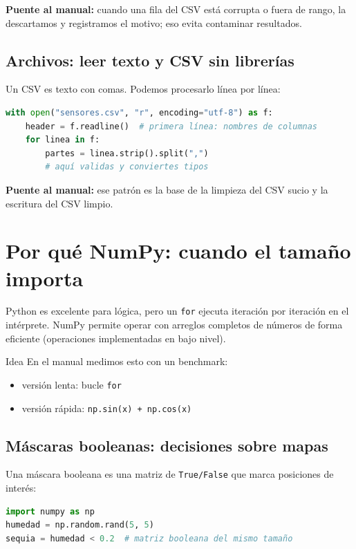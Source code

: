\documentclass[11pt, a4paper]{article}
\begin{document}
\textbf{Puente al manual:} cuando una fila del CSV está corrupta o fuera de rango, la descartamos y registramos el motivo; eso evita contaminar resultados.

\subsection{Archivos: leer texto y CSV sin librerías}
Un CSV es texto con comas. Podemos procesarlo línea por línea:

\begin{lstlisting}[language=Python, caption={Lectura mínima de un CSV (sin pandas)}]
with open("sensores.csv", "r", encoding="utf-8") as f:
    header = f.readline()  # primera línea: nombres de columnas
    for linea in f:
        partes = linea.strip().split(",")
        # aquí validas y conviertes tipos
\end{lstlisting}

\textbf{Puente al manual:} ese patrón es la base de la limpieza del CSV sucio y la escritura del CSV limpio.
\newpage
\section{Por qué NumPy: cuando el tamaño importa}
Python es excelente para lógica, pero un \texttt{for} ejecuta iteración por iteración en el intérprete.
NumPy permite operar con arreglos completos de números de forma eficiente (operaciones implementadas en bajo nivel).

\begin{conceptbox}{Idea}
En el manual medimos esto con un benchmark:
\begin{itemize}
\item versión lenta: bucle \texttt{for}
\item versión rápida: \texttt{np.sin(x) + np.cos(x)}
\end{itemize}
\end{conceptbox}

\subsection{Máscaras booleanas: decisiones sobre mapas}
Una máscara booleana es una matriz de \texttt{True/False} que marca posiciones de interés:

\begin{lstlisting}[language=Python, caption={Máscara booleana en matriz}]
import numpy as np
humedad = np.random.rand(5, 5)
sequia = humedad < 0.2  # matriz booleana del mismo tamaño
\end{lstlisting}
\end{document}
